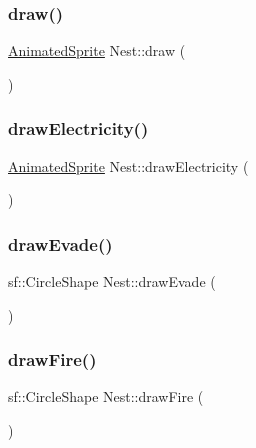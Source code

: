 \subsubsection{\texorpdfstring{draw()}{draw()}}
{\footnotesize\ttfamily \hyperlink{class_animated_sprite}{Animated\+Sprite} Nest\+::draw (\begin{DoxyParamCaption}{ }\end{DoxyParamCaption})}

\mbox{\label{class_nest_ad90f39c39a435c3cb2702880b624d254}} 
\subsubsection{\texorpdfstring{draw\+Electricity()}{drawElectricity()}}
{\footnotesize\ttfamily \hyperlink{class_animated_sprite}{Animated\+Sprite} Nest\+::draw\+Electricity (\begin{DoxyParamCaption}{ }\end{DoxyParamCaption})}

\mbox{\label{class_nest_a69a224e6296dadbeee744697d308259c}} 
\subsubsection{\texorpdfstring{draw\+Evade()}{drawEvade()}}
{\footnotesize\ttfamily sf\+::\+Circle\+Shape Nest\+::draw\+Evade (\begin{DoxyParamCaption}{ }\end{DoxyParamCaption})}

\mbox{\label{class_nest_a3118b2257f6864632abf907c42af94fd}} 
\subsubsection{\texorpdfstring{draw\+Fire()}{drawFire()}}
{\footnotesize\ttfamily sf\+::\+Circle\+Shape Nest\+::draw\+Fire (\begin{DoxyParamCaption}{ }\end{DoxyParamCaption})}

\mbox{\label{class_nest_a31a181f820acdcc53c5c0954ec57bdd2}} 
